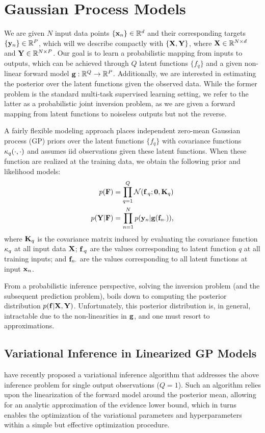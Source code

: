 \section{Gaussian Process Models}
We are given $N$ input data points $ \{ \mathbf{x}_n  \} \in \mathbb{R}^{d}$ and their corresponding  
targets $\{ \mathbf{y}_n  \} \in \mathbb{R}^{P}$, which will  we describe compactly with $\left\{{\mathbf{X}, \mathbf{Y}}\right\}$,
where $\mathbf{X} \in \mathbb{R}^{N \times d}$  and $\mathbf{Y} \in \mathbb{R}^{N \times P}$. Our goal is 
to learn a probabilistic mapping from inputs to outputs, which can be achieved through $Q$ latent  functions $\{ f_q \}$ and a given non-linear forward model $\mathbf{g} : \mathbb{R}^{Q} \to \mathbb{R}^{P}$. Additionally, we are interested in estimating the posterior over the latent functions given the observed data. 
While the former problem  is the standard multi-task supervised learning setting, we refer 
to the latter  as a probabilistic joint inversion problem, as we are given a forward mapping from 
latent functions to noiseless outputs but not the reverse. 

A fairly flexible modeling approach places independent zero-mean Gaussian process (GP) priors over 
the latent functions $\{ f_q \}$ with covariance functions $\kappa_q(\cdot, \cdot)$ and assumes iid observations given these latent functions. When these function are realized at the training data,
we obtain the following prior and likelihood models:
\begin{align}
	\label{eq:gp-model-1}
	p(\mathbf{F})  &=  \prod_{q=1}^{Q} \mathcal{N}(\mathbf{f}_{\cdot q}; \mathbf{0}, \mathbf{K}_q) \\
	\label{eq:gp-model-2}	
	p(\mathbf{Y} | \mathbf{F}) &= \prod_{n=1}^N p(\mathbf{y}_n | \mathbf{g} ( \mathbf{f}_{n \cdot} )) \text{,}
\end{align}
where $\mathbf{K}_q$ is the covariance matrix induced by evaluating  the covariance 
function $\kappa_q$ at all input data $\mathbf{X}$; $\mathbf{f}_{\cdot q}$ are  the values 
corresponding to latent function $q$ at all training inputs; 
and $\mathbf{f}_{n \cdot}$ are  the values corresponding to all latent functions at input $\mathbf{x}_n$. 

From a probabilistic inference perspective, solving the inversion problem (and the 
subsequent prediction problem), boils down to computing the posterior distribution 
$p(\mathbf{f} | \mathbf{X}, \mathbf{Y})$. Unfortunately, this posterior distribution is, in general, 
intractable due to the non-linearities in $\mathbf{g}$, and one must resort to approximations.
%
\subsection{Variational Inference in Linearized GP Models}
\citet{steinberg-bonilla-nips-2014} have recently proposed a variational inference algorithm that
addresses the above inference problem for single output observations ($Q=1$).  
Such an algorithm relies upon the linearization of the forward model around the posterior 
mean, allowing for an analytic approximation of the evidence lower bound, which in turns 
enables the optimization of the variational parameters and hyperparameters within a simple 
but effective optimization procedure.  


